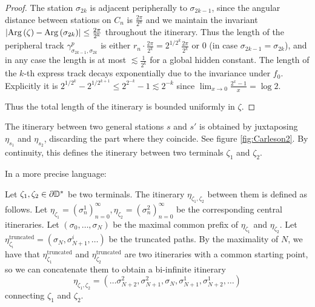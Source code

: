 \begin{proof}
The station $\sigma_{2k}$ is adjacent peripherally to $\sigma_{2k-1}$,
since the angular distance between stations on $C_{n}$ is $\frac{2\pi}{2^{n}}$
and we maintain the invariant $\left|\mathrm{Arg}\left(\zeta\right)-\mathrm{Arg}\left(\sigma_{2k}\right)\right|\leq\frac{2\pi}{2^{k}}$
throughout the itinerary. Thus the length of the peripheral track $\gamma_{\sigma_{2k-1},\sigma_{2k}}^{p}$
is either $r_{n}\cdot\frac{2\pi}{2^{k}}=2^{1/2^{k}}\frac{2\pi}{2^{k}}$
or $0$ (in case $\sigma_{2k-1}=\sigma_{2k}$), and in any case the
length is at most $\lesssim\frac{1}{2^{k}}$ for a global hidden constant.
The length of the $k$-th express track decays exponentially due to
the invariance under $f_{0}$. Explicitly it is $2^{1/2^{k}}-2^{1/2^{k+1}}\leq2^{2^{-k}}-1\lesssim2^{-k}$
since $\lim_{x\to0}\frac{2^{x}-1}{x}=\log2$.

Thus the total length of the itinerary is bounded uniformly in $\zeta$.
\end{proof}


The itinerary between two general stations $s$ and $s'$ is obtained by juxtaposing $\eta_{s_1}$ and $\eta_{s_2}$, discarding the part where they coincide. See figure \ref{fig:Carleson2}. 
By continuity, this defines the itinerary between two terminals $\zeta_1$ and $\zeta_2$.

In a more precise language:
\begin{definition}
	Let $\zeta_{1},\zeta_{2}\in\partial\mathbb{D}^*$ be two terminals. The itinerary $\eta_{\zeta_{1},\zeta_{2}}$ between them is defined as follows.
	Let $\eta_{\zeta_{1}}=\left(\sigma_{n}^{1}\right)_{n=0}^{\infty},\eta_{\zeta_{2}}=\left(\sigma_{n}^{2}\right)_{n=0}^{\infty}$
	be the corresponding central itineraries.	
	Let $\left(\sigma_{0},\ldots,\sigma_{N}\right)$ be the maximal common
	prefix of $\eta_{\zeta_{1}}$ and $\eta_{\zeta_{2}}$. Let $\eta_{\zeta_{i}}^{\text{truncated}}=\left(\sigma_{N},\sigma_{N+1}^{i},\ldots\right)$
	be the truncated paths. By the maximality of $N$, we have that $\eta_{\zeta_{1}}^{\text{truncated}}$
	and $\eta_{\zeta_{2}}^{\text{truncated}}$ are two itineraries with a common
	starting point, so we can concatenate them to obtain a bi-infinite itinerary 
	\[
	\eta_{\zeta_{1},\zeta_{2}}=\left(\ldots\sigma_{N+2}^{2},\sigma_{N+1}^{2},\sigma_{N},\sigma_{N+1}^{1},\sigma_{N+2}^{1},\ldots\right)
	\]
	connecting $\zeta_{1}$ and $\zeta_{2}$.
	
	
\end{definition}

